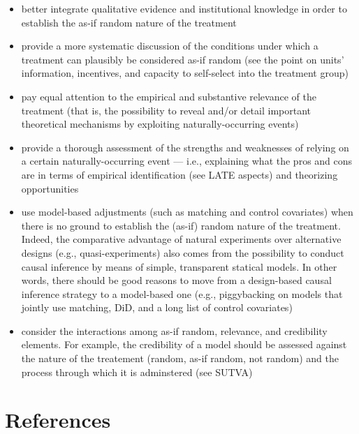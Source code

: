 \documentclass[nobib]{tufte-handout}
\begin{document}
\begin{refsection}
\begin{itemize}
    \item better integrate qualitative evidence and institutional knowledge in
        order to establish the as-if random nature of the treatment
    \item provide a more systematic discussion of the conditions under which a
        treatment can plausibly be considered as-if random  (see the point on 
        units' information, incentives, and capacity to self-select into the
        treatment group) 
    \item pay equal attention to the empirical and substantive relevance of the
        treatment (that is, the possibility to reveal and/or detail important 
        theoretical mechanisms by exploiting naturally-occurring events)
    \item provide a thorough assessment of the strengths and weaknesses of 
        relying on a certain naturally-occurring event --- i.e., explaining what
        the pros and cons are in terms of empirical identification (see LATE aspects)
        and theorizing opportunities 
    \item use model-based adjustments (such as matching and control covariates)
        when there is no ground to establish the (as-if) random nature of the 
        treatment. Indeed, the comparative advantage of natural experiments over
        alternative designs (e.g., quasi-experiments) also comes from the 
        possibility to conduct causal inference by means of simple, transparent 
        statical models. In other words, there should be good reasons to
        move from a design-based causal inference strategy to a model-based one
        (e.g., piggybacking on models that jointly use matching, DiD, and a long
        list of control covariates)
    \item consider the interactions among as-if random, relevance, and 
        credibility elements. For example, the credibility of a model should be 
        assessed against the nature of the treatement (random, as-if random, not
        random) and the process through which it is adminstered (see SUTVA)
\end{itemize}

%
\section{References}
\printbibliography[heading=none]
\end{refsection}
\end{document}
